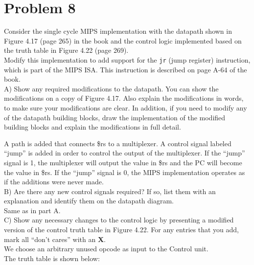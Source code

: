 \documentclass[10pt,letterpaper]{article}
\begin{document}
\section{Problem 8}
Consider the single cycle MIPS implementation with the datapath shown in Figure 4.17 (page 265) in the book and the control logic implemented based on the truth table in Figure 4.22 (page 269).\\
Modify this implementation to add support for the \texttt{jr} (jump register) instruction, which is part of the MIPS ISA. This instruction is described on page A-64 of the book.\\
A) Show any required modifications to the datapath. You can show the modifications on a copy of Figure 4.17. Also explain the modifications in words, to make sure your modifications are clear. In addition, if you need to modify any of the datapath building blocks, draw the implementation of the modified building blocks and explain the modifications in full detail.\\
\begin{center}
\end{center}
A path is added that connects \$rs to a multiplexer. A control signal labeled ``jump'' is added in order to control the output of the multiplexer. If the ``jump'' signal is 1, the multiplexer will output the value in \$rs and the PC will become the value in \$rs. If the ``jump'' signal is 0, the MIPS implementation operates as if the additions were never made.\\
B) Are there any new control signals required? If so, list them with an explanation and identify them on the datapath diagram.\\
Same as in part A.\\
C) Show any necessary changes to the control logic by presenting a modified version of the control truth table in Figure 4.22. For any entries that you add, mark all ``don't cares'' with an \textbf{X}.\\
We choose an arbitrary unused opcode as input to the Control unit.\\
The truth table is shown below:
\begin{center}
\end{center}
\end{document}

